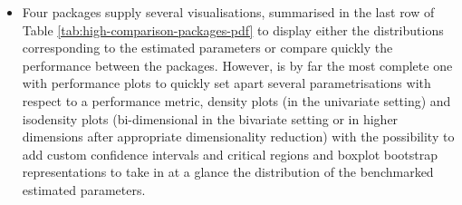 \begin{itemize}
{  confidence intervals in GMMs} and row 6 in Table \ref{tab:high-comparison-packages-pdf}.
\item
  Four packages supply several visualisations, summarised in the last row of Table \ref{tab:high-comparison-packages-pdf} to display either the distributions corresponding to the estimated parameters or compare quickly the performance between the packages. However,  is by far the most complete one with performance plots to quickly set apart several parametrisations with respect to a performance metric, density plots (in the univariate setting) and isodensity plots (bi-dimensional in the bivariate setting or in higher dimensions after appropriate dimensionality reduction) with the possibility to add custom confidence intervals and critical regions and boxplot bootstrap representations to take in at a glance the distribution of the benchmarked estimated parameters.
\end{itemize}

